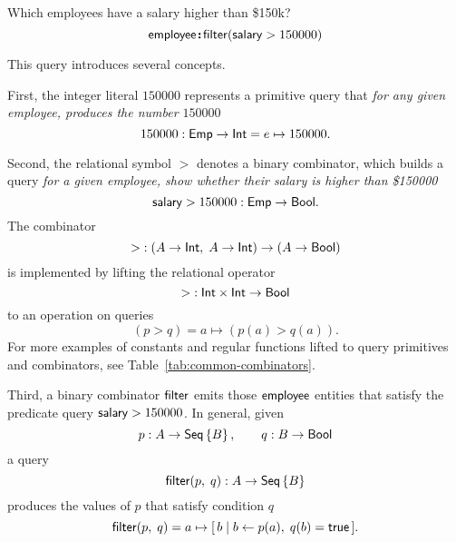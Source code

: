 \begin{demo}
    \label{ex:filter-by-salary}
    Which employees have a salary higher than \$150k?
    \begin{equation*}
        \textup{\textsf{employee}}\!\boldsymbol{:}\!\textup{\textsf{filter}}(\textup{\textsf{salary}}>150000)
    \end{equation*}
\end{demo}

This query introduces several concepts.

First, the integer literal $150000$ represents a primitive query that
\emph{for any given employee, produces the number $150000$}
\begin{equation*}
    150000 : \textup{\textsf{Emp}} \to \textup{\textsf{Int}} = e \mapsto 150000.
\end{equation*}

Second, the relational symbol ${>}$ denotes a binary combinator, which builds a
query \emph{for a given employee, show whether their salary is higher than
\$150000}
\begin{equation*}
    \textup{\textsf{salary}} > 150000 : \textup{\textsf{Emp}} \to \textup{\textsf{Bool}}.
\end{equation*}
The combinator
\begin{equation*}
    {>} : (A \to \textup{\textsf{Int}},\; A \to \textup{\textsf{Int}}) \to (A \to \textup{\textsf{Bool}})
\end{equation*}
is implemented by lifting the relational operator
\begin{equation*}
    {>} : \textup{\textsf{Int}} \times \textup{\textsf{Int}} \to \textup{\textsf{Bool}}
\end{equation*}
to an operation on queries
\begin{equation*}
    (p > q) = a \mapsto (p(a) > q(a)).
\end{equation*}
For more examples of constants and regular functions lifted to query primitives
and combinators, see Table~\ref{tab:common-combinators}.

Third, a binary combinator $\textup{\textsf{filter}}$ emits those $\textup{\textsf{employee}}$ entities that
satisfy the predicate query $\textup{\textsf{salary}} > 150000$.  In general, given
\begin{equation*}
    p : A \to \textup{\textsf{Seq}}\left\{B\right\}, \qquad q : B \to \textup{\textsf{Bool}}
\end{equation*}
a query
\begin{equation*}
    \textup{\textsf{filter}}(p,\; q) : A \to \textup{\textsf{Seq}}\left\{B\right\}
\end{equation*}
produces the values of $p$ that satisfy condition $q$
\begin{equation*}
    \textup{\textsf{filter}}(p,\; q) = a \mapsto [\,b \mid b \gets p(a),\; q(b)=\textup{\textsf{true}}\,].
\end{equation*}

